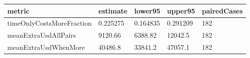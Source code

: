 \begin{tabular}{lllll}
\toprule
metric & estimate & lower95 & upper95 & pairedCases \\
\midrule
timeOnlyCostsMoreFraction & 0.225275 & 0.164835 & 0.291209 & 182 \\
meanExtraUsdAllPairs & 9120.66 & 6388.82 & 12042.5 & 182 \\
meanExtraUsdWhenMore & 40486.8 & 33841.2 & 47057.1 & 182 \\
\bottomrule
\end{tabular}
